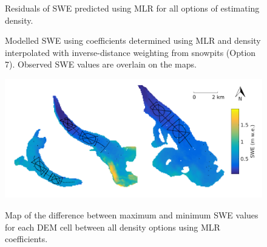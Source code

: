 \documentclass[12pt]{article}
\begin{document}
\begin{figure}[H]
	\caption{Residuals of SWE predicted using MLR for all options of estimating density.}
	\label{fig:MLRresiduals_all}
\end{figure}

\begin{figure}[H]
	\caption{Modelled SWE using coefficients determined using MLR and density interpolated with inverse-distance weighting from snowpits (Option 7). Observed SWE values are overlain on the maps.}
	\label{fig:MLRmodelledSWE}
\end{figure}

\begin{figure}[H]
	\centering
	\includegraphics[width =\textwidth]{MLR_SWEdifferenceMap.png}\\
	\caption{Map of the difference between maximum and minimum SWE values for each DEM cell between all density options using MLR coefficients.}
	\label{fig:MLR_SWEdiffMap}
\end{figure}
\end{document}
